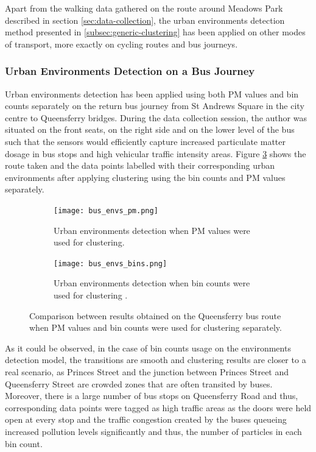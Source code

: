 \documentclass[bsc,frontabs,twoside,singlespacing, parskip,deptreport]{infthesis}     %
\begin{document}
Apart from the walking data gathered on the route around Meadows Park described in section \ref{sec:data-collection}, the urban environments detection method presented in \ref{subsec:generic-clustering} has been applied on other modes of transport, more exactly on cycling routes and bus journeys.

\subsubsection*{Urban Environments Detection on a Bus Journey}

Urban environments detection has been applied using both PM values and bin counts separately on the return bus journey from St Andrews Square in the city centre to Queensferry bridges. During the data collection session, the author was situated on the front seats, on the right side and on the lower level of the bus such that the sensors would efficiently capture increased particulate matter dosage in bus stops and high vehicular traffic intensity areas. Figure \ref{fig:queensferry-urban-environments} shows the route taken and the data points labelled with their corresponding urban environments after applying clustering using the bin counts and PM values separately.

\begin{figure}[h!]
  \begin{subfigure}[t]{\textwidth}
    \texttt{[image: bus\_envs\_pm.png]}
    \caption{Urban environments detection when PM values were used for clustering.}
    \label{fig:queensferry-env-pm}
  \end{subfigure}
  \hfill
  \begin{subfigure}[t]{\textwidth}
    \texttt{[image: bus\_envs\_bins.png]}
    \caption{Urban environments detection when bin counts were used for clustering .}
    \label{fig:queensferry-env-bins}
  \end{subfigure}
  \caption{Comparison between results obtained on the Queensferry bus route when PM values and bin counts were used for clustering separately.}
  \label{fig:queensferry-urban-environments}
\end{figure}

As it could be observed, in the case of bin counts usage on the environments detection model, the transitions are smooth and clustering results are closer to a real scenario, as Princes Street and the junction between Princes Street and Queensferry Street are crowded zones that are often transited by buses. Moreover, there is a large number of bus stops on Queensferry Road and thus, corresponding data points were tagged as high traffic areas as the doors were held open at every stop and the traffic congestion created by the buses queueing increased pollution levels significantly and thus, the number of particles in each bin count.
\end{document}
